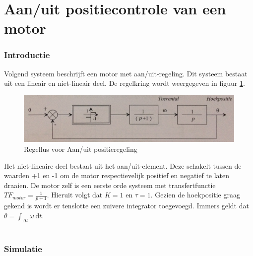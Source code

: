 \documentclass[12pt]{article}
\begin{document}
\part{Aan/uit positiecontrole van een motor}
\section{Introductie}
Volgend systeem beschrijft een motor met aan/uit-regeling. Dit systeem bestaat uit een lineair en niet-lineair deel. De regelkring wordt weergegeven in figuur \ref{regellus}.
\begin{figure}[!h]
	\centering
	\includegraphics[width=\textwidth, keepaspectratio]{regellus.png}
	\caption{Regellus voor Aan/uit positieregeling}
	\label{regellus}	
\end{figure}

\noindent
Het niet-lineaire deel bestaat uit het aan/uit-element. Deze schakelt tussen de waarden +1 en -1 om de motor respectievelijk positief en negatief te laten draaien. De motor zelf is een eerste orde systeem met transfertfunctie $TF_{motor} = \frac{1}{p+1}$. Hieruit volgt dat $K=1$ en $\tau=1$. Gezien de hoekpositie graag gekend is wordt er tenslotte een zuivere integrator toegevoegd. Immers geldt dat $\theta = \int_{\Delta t} \omega \ \mathrm{d}t$. \\ \\
\section{Simulatie}
\end{document}
